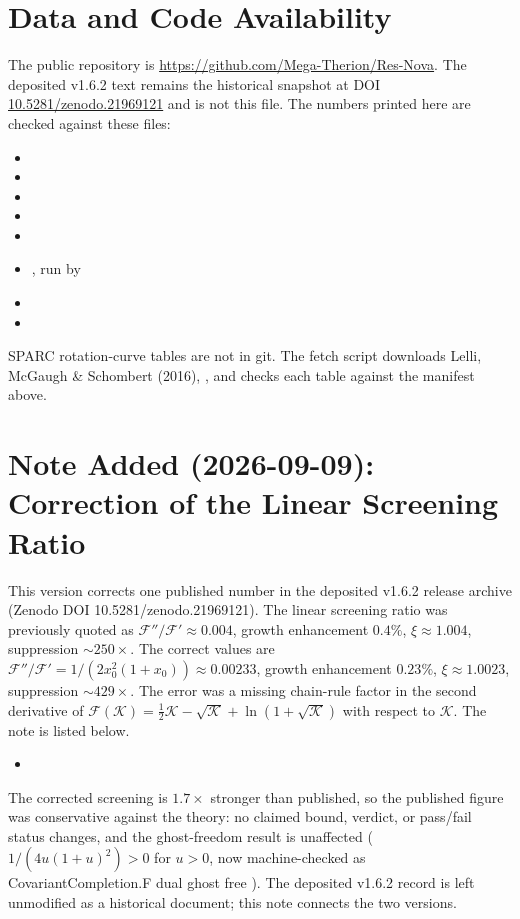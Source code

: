 \documentclass[aps,prd,preprint,superscriptaddress,nofootinbib,amsmath,amssymb,floatfix]{revtex4-2}
\makeatletter
\DeclareRobustCommand{\rntexttt}[1]{%
  \ifmmode
    \nfss@text{\ttfamily\hyphenchar\font=-1 #1}%
  \else
    \hmode@bgroup\ttfamily\hyphenchar\font=-1 #1\egroup
  \fi}
\DeclareRobustCommand{\_}{%
    \ifmmode\nfss@text{\textunderscore}\else\textunderscore\penalty\z@\fi}%
\let\texttt\rntexttt
\makeatother
\begin{document}
\section*{Data and Code Availability}
The public repository is \url{https://github.com/Mega-Therion/Res-Nova}. The deposited v1.6.2 text remains the historical snapshot at DOI \href{https://doi.org/10.5281/zenodo.21969121}{10.5281/zenodo.21969121} and is not this file. The numbers printed here are checked against these files:
\begin{itemize}\raggedright
\item {}
\item {}
\item {}
\item {}
\item {}
\item {}, run by 
\item {}
\item {}
\end{itemize}
SPARC rotation-curve tables are not in git. The fetch script downloads Lelli, McGaugh \& Schombert (2016), , and checks each table against the manifest above.

\section*{Note Added (2026-09-09): Correction of the Linear Screening Ratio}
This version corrects one published number in the deposited v1.6.2 release archive (Zenodo DOI 10.5281/zenodo.21969121). The linear screening ratio was previously quoted as $\mathcal{F}''/\mathcal{F}' \approx 0.004$, growth enhancement $0.4\%$, $\xi \approx 1.004$, suppression $\sim250\times$. The correct values are $\mathcal{F}''/\mathcal{F}' = 1/(2x_0^2(1+x_0)) \approx 0.00233$, growth enhancement $0.23\%$, $\xi \approx 1.0023$, suppression $\sim429\times$. The error was a missing chain-rule factor in the second derivative of $\mathcal{F}(\mathcal{K}) = \tfrac{1}{2}\mathcal{K} - \sqrt{\mathcal{K}} + \ln(1+\sqrt{\mathcal{K}})$ with respect to $\mathcal{K}$. The note is listed below.
\begin{itemize}\raggedright
\item {}
\end{itemize}
The corrected screening is $1.7\times$ stronger than published, so the published figure was conservative against the theory: no claimed bound, verdict, or pass/fail status changes, and the ghost-freedom result is unaffected ($1/(4u(1+u)^2) > 0$ for $u > 0$, now machine-checked as \texttt{CovariantCompletion.F\_dual\_ghost\_free}). The deposited v1.6.2 record is left unmodified as a historical document; this note connects the two versions.
\end{document}
